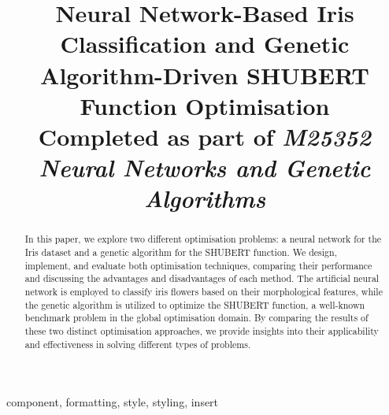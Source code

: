 \documentclass[conference]{inc/IEEEtran}
\begin{document}
\title{Neural Network-Based Iris Classification and Genetic Algorithm-Driven SHUBERT Function Optimisation \\
{\footnotesize Completed as part of \textit{M25352 Neural Networks and Genetic Algorithms}}
}


\author{
    \and
}

\maketitle

\begin{abstract}
    In this paper, we explore two different optimisation problems: a neural network for the Iris dataset and a genetic algorithm for the SHUBERT function. We design, implement, and evaluate both optimisation techniques, comparing their performance and discussing the advantages and disadvantages of each method. The artificial neural network is employed to classify iris flowers based on their morphological features, while the genetic algorithm is utilized to optimize the SHUBERT function, a well-known benchmark problem in the global optimisation domain. By comparing the results of these two distinct optimisation approaches, we provide insights into their applicability and effectiveness in solving different types of problems.
\end{abstract}

\begin{IEEEkeywords}
    component, formatting, style, styling, insert
\end{IEEEkeywords}
\end{document}
